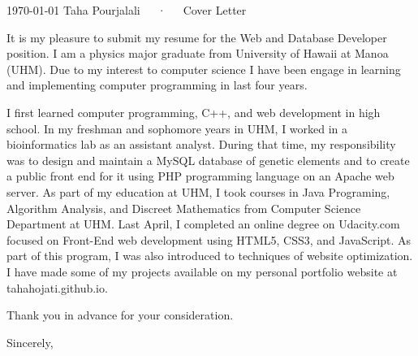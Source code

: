 \documentclass[11pt, a4paper]{awesome-cv}
\begin{document}
\makecvheader

\makecvfooter
  {\today}
  {Taha Pourjalali~~~·~~~Cover Letter}
  {}

\makelettertitle

\begin{cvletter}

It is my pleasure to submit my resume for the Web and Database Developer position. I am a physics major graduate from University of Hawaii at Manoa (UHM). Due to my interest to computer science I have been engage in learning and implementing computer programming in last four years.

I first learned computer programming, C++, and web development in high school.  In my freshman and sophomore years in UHM, I worked in a bioinformatics lab as an assistant analyst. During that time, my responsibility was to design and maintain a MySQL database of genetic elements and to create a public front end for it using PHP programming language on an Apache web server. As part of my education at UHM, I took courses in Java Programing, Algorithm Analysis, and Discreet Mathematics from Computer Science Department at UHM.  Last April, I completed an online degree on Udacity.com focused on Front-End web development using HTML5, CSS3, and JavaScript. As part of this program, I was also introduced to techniques of website optimization. I have made some of my projects available on my personal portfolio website at tahahojati.github.io.


Thank you in advance for your consideration.


Sincerely,


\end{cvletter}


\makeletterclosing
\end{document}
